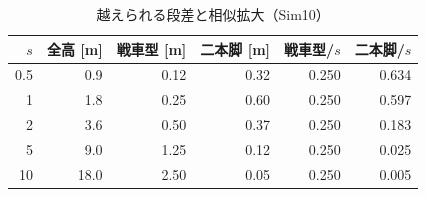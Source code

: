 \begin{longtable}{rrrrrr}
\caption{越えられる段差と相似拡大（Sim10）}\\
\toprule
$s$ & 全高 [m] & 戦車型 [m] & 二本脚 [m] & 戦車型/$s$ & 二本脚/$s$ \\ \midrule \endhead
0.5 & 0.9 & 0.12 & 0.32 & 0.250 & 0.634 \\
1 & 1.8 & 0.25 & 0.60 & 0.250 & 0.597 \\
2 & 3.6 & 0.50 & 0.37 & 0.250 & 0.183 \\
5 & 9.0 & 1.25 & 0.12 & 0.250 & 0.025 \\
10 & 18.0 & 2.50 & 0.05 & 0.250 & 0.005 \\
\bottomrule
\end{longtable}
